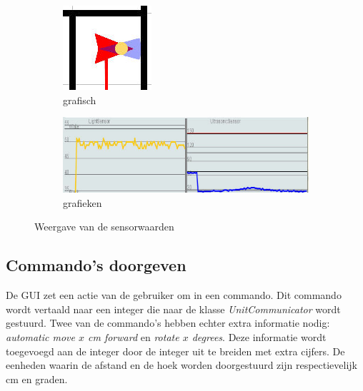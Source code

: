 \documentclass[t1]{penoverslag}
\begin{document}
\begin{figure}
        \centering
        \begin{subfigure}[hb]{0.25\textwidth}
                \centering
                \includegraphics[width=\textwidth]{guiRobot}
                \caption{grafisch}
        \end{subfigure}%
        \begin{subfigure}[hb]{0.75\textwidth}
                \centering
                \includegraphics[width=\textwidth]{guiSensor}
                \caption{grafieken}
        \end{subfigure}
 \caption{Weergave van de sensorwaarden}
\label{fig:guiSensoren}
\end{figure}

\subsection{Commando's doorgeven} %
\label{ssec:commands}
De GUI zet een actie van de gebruiker om in een commando. Dit commando wordt vertaald naar een integer die naar de klasse \textit{UnitCommunicator} wordt gestuurd. Twee van de commando's hebben echter extra informatie nodig: \textit{automatic move $x$ cm forward} en \textit{rotate $x$ degrees}. Deze informatie wordt toegevoegd aan de integer door de integer uit te breiden met extra cijfers. De eenheden waarin de afstand en de hoek worden doorgestuurd zijn respectievelijk cm en graden.\\
\end{document}
